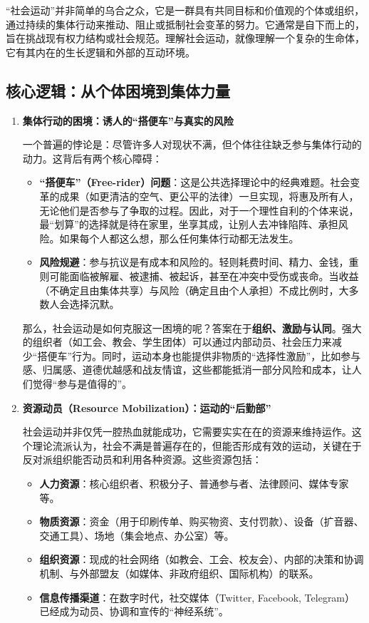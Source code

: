 “社会运动”并非简单的乌合之众，它是一群具有共同目标和价值观的个体或组织，通过持续的集体行动来推动、阻止或抵制社会变革的努力。它通常是自下而上的，旨在挑战现有权力结构或社会规范。理解社会运动，就像理解一个复杂的生命体，它有其内在的生长逻辑和外部的互动环境。

\subsection{核心逻辑：从个体困境到集体力量}

\begin{enumerate}
    \item \textbf{集体行动的困境：诱人的“搭便车”与真实的风险}

    一个普遍的悖论是：尽管许多人对现状不满，但个体往往缺乏参与集体行动的动力。这背后有两个核心障碍：

    \begin{itemize}
        \item \textbf{“搭便车”（Free-rider）问题}：这是公共选择理论中的经典难题。社会变革的成果（如更清洁的空气、更公平的法律）一旦实现，将惠及所有人，无论他们是否参与了争取的过程。因此，对于一个理性自利的个体来说，最“划算”的选择就是待在家里，坐享其成，让别人去冲锋陷阵、承担风险。如果每个人都这么想，那么任何集体行动都无法发生。
        \item \textbf{风险规避}：参与抗议是有成本和风险的。轻则耗费时间、精力、金钱，重则可能面临被解雇、被逮捕、被起诉，甚至在冲突中受伤或丧命。当收益（不确定且由集体共享）与风险（确定且由个人承担）不成比例时，大多数人会选择沉默。
    \end{itemize}

    那么，社会运动是如何克服这一困境的呢？答案在于\textbf{组织、激励与认同}。强大的组织者（如工会、教会、学生团体）可以通过内部动员、社会压力来减少“搭便车”行为。同时，运动本身也能提供非物质的“选择性激励”，比如参与感、归属感、道德优越感和战友情谊，这些都能抵消一部分风险和成本，让人们觉得“参与是值得的”。

    \item \textbf{资源动员（Resource Mobilization）：运动的“后勤部”}

    社会运动并非仅凭一腔热血就能成功，它需要实实在在的资源来维持运作。这个理论流派认为，社会不满是普遍存在的，但能否形成有效的运动，关键在于反对派组织能否动员和利用各种资源。这些资源包括：

    \begin{itemize}
        \item \textbf{人力资源}：核心组织者、积极分子、普通参与者、法律顾问、媒体专家等。
        \item \textbf{物质资源}：资金（用于印刷传单、购买物资、支付罚款）、设备（扩音器、交通工具）、场地（集会地点、办公室）等。
        \item \textbf{组织资源}：现成的社会网络（如教会、工会、校友会）、内部的决策和协调机制、与外部盟友（如媒体、非政府组织、国际机构）的联系。
        \item \textbf{信息传播渠道}：在数字时代，社交媒体（Twitter, Facebook, Telegram）已经成为动员、协调和宣传的“神经系统”。
    \end{itemize}


\end{enumerate}
